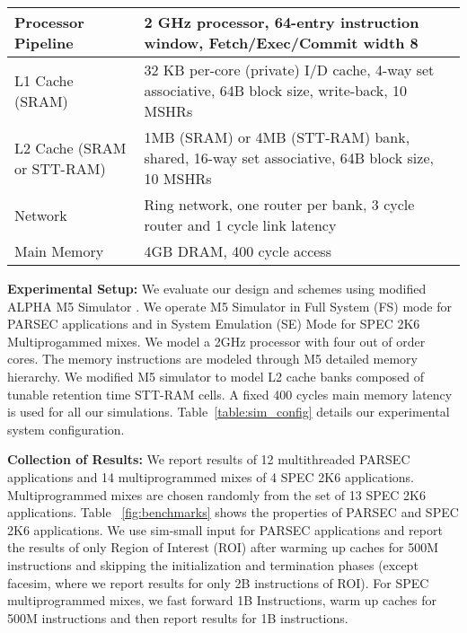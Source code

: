 

\begin {table*} [t]
 \scriptsize
  \centering
 \caption {{\bf Baseline processor, cache, memory and network configuration}} \label{table:sim_config}
 \begin{tabular}{|l|l|}
 \hline
Processor Pipeline & 2 GHz processor, 64-entry instruction window, Fetch/Exec/Commit width 8 \\
\hline
L1 Cache (SRAM) & 32 KB per-core (private) I/D cache, 4-way set associative, 64B block size, write-back, 10 MSHRs \\
\hline
L2 Cache (SRAM or STT-RAM) &  1MB (SRAM) or 4MB (STT-RAM) bank, shared, 16-way set associative, 64B block size, 10 MSHRs \\
\hline
Network & Ring network, one router per bank, 3 cycle router and 1 cycle link latency \\
\hline
Main Memory & 4GB DRAM, 400 cycle access \\
\hline
\end{tabular}
\end{table*}

\noindent\textbf{Experimental Setup:}
We evaluate our design and schemes using modified ALPHA M5 Simulator \cite{M5} . 
We operate M5 Simulator in Full System (FS) mode for PARSEC applications and in System Emulation (SE) Mode for SPEC 2K6 Multiprogammed mixes. We model a 2GHz processor with four out of order cores. The memory instructions are modeled through M5 detailed memory hierarchy. We modified M5  simulator to model  L2 cache banks composed of tunable retention time STT-RAM cells. A fixed 400 cycles main memory latency is used for all our simulations. Table~\ref{table:sim_config} details our experimental system configuration. 

\noindent\textbf{Collection of Results:}
We report results of 12 multithreaded PARSEC applications and 14 multiprogrammed mixes of 4 SPEC 2K6 applications. 
Multiprogrammed mixes are chosen randomly from the set of 13 SPEC 2K6 applications.
Table ~\ref{fig:benchmarks} shows the properties of PARSEC and SPEC 2K6 applications.
We use sim-small input for PARSEC applications and report the results of only Region of Interest (ROI) 
after warming up caches for 500M instructions and skipping the initialization and termination phases 
(except facesim, where we report results for only 2B instructions of ROI). For SPEC multiprogrammed mixes,
we fast forward 1B Instructions, warm up caches for 500M instructions and then report
results for 1B instructions. 

